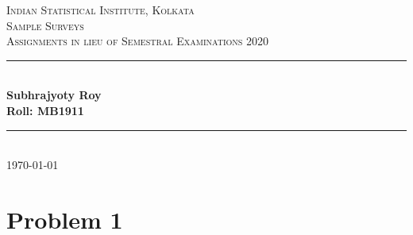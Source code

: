 \documentclass[12pt]{article}
\newcommand{\HRule}{\rule{\linewidth}{0.5mm}} %
\theoremstyle{definition}
\begin{document}
\begin{titlepage}
    
\centering
\textsc{\LARGE Indian Statistical Institute, Kolkata}\\[1.5cm] %
\textsc{\Large Sample Surveys}\\[0.5cm] %
\textsc{\large Assignments in lieu of Semestral Examinations 2020}\\[0.5cm] %

\HRule \\[0.4cm]
\large \textbf{Subhrajyoty Roy}\\
\large \textbf{Roll:  MB1911}\\
\HRule \\[1.5cm]
\normalsize \today

\end{titlepage}


\tableofcontents
\clearpage



\section{Problem 1}
\end{document}
